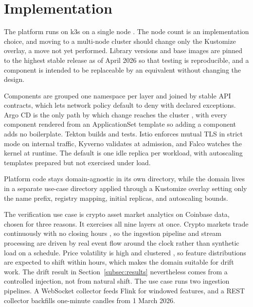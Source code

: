 
\section{Implementation}
\label{sec:implementation}

The platform runs on k3s on a single node \cite{kubernetes2024}. The node count is an implementation choice, and moving to a multi-node cluster should change only the Kustomize overlay, a move not yet performed. Library versions and base images are pinned to the highest stable release as of April 2026 so that testing is reproducible, and a component is intended to be replaceable by an equivalent without changing the design.

Components are grouped one namespace per layer and joined by stable API contracts, which lets network policy default to deny with declared exceptions. Argo CD is the only path by which change reaches the cluster \cite{limoncelli2022gitops}, with every component rendered from an ApplicationSet template so adding a component adds no boilerplate. Tekton builds and tests. Istio enforces mutual TLS in strict mode on internal traffic, Kyverno validates at admission, and Falco watches the kernel at runtime. The default is one idle replica per workload, with autoscaling templates prepared but not exercised under load.

Platform code stays domain-agnostic in its own directory, while the domain lives in a separate use-case directory applied through a Kustomize overlay setting only the name prefix, registry mapping, initial replicas, and autoscaling bounds.

The verification use case is crypto asset market analytics on Coinbase data, chosen for three reasons. It exercises all nine layers at once. Crypto markets trade continuously with no closing hours \cite{makarov2020trading}, so the ingestion pipeline and stream processing are driven by real event flow around the clock rather than synthetic load on a schedule. Price volatility is high and clustered \cite{katsiampa2017volatility}, so feature distributions are expected to shift within hours, which makes the domain suitable for drift work. The drift result in Section~\ref{subsec:results} nevertheless comes from a controlled injection, not from natural shift. The use case runs two ingestion pipelines. A WebSocket collector feeds Flink for windowed features, and a REST collector backfills one-minute candles from 1 March 2026.
